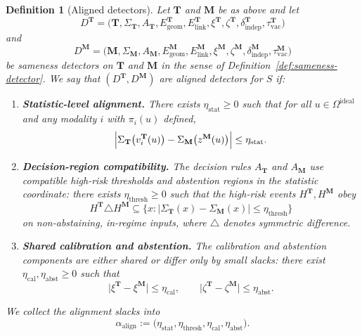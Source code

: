 \documentclass[11pt]{article}
\newtheorem{definition}{Definition}
\begin{document}
\begin{definition}[Aligned detectors]
\label{def:aligned-detectors}
Let $\mathbf{T}$ and $\mathbf{M}$ be as above and let
\[
D^{\mathbf{T}} =
\bigl(
  \mathbf{T},
  \Sigma_{\mathbf{T}}, A_{\mathbf{T}},
  E_{\mathrm{geom}}^{\mathbf{T}},
  E_{\mathrm{link}}^{\mathbf{T}},
  \xi^{\mathbf{T}}, \zeta^{\mathbf{T}},
  \delta_{\mathrm{indep}}^{\mathbf{T}},
  \tau_{\mathrm{vac}}^{\mathbf{T}}
\bigr)
\]
and
\[
D^{\mathbf{M}} =
\bigl(
  \mathbf{M},
  \Sigma_{\mathbf{M}}, A_{\mathbf{M}},
  E_{\mathrm{geom}}^{\mathbf{M}},
  E_{\mathrm{link}}^{\mathbf{M}},
  \xi^{\mathbf{M}}, \zeta^{\mathbf{M}},
  \delta_{\mathrm{indep}}^{\mathbf{M}},
  \tau_{\mathrm{vac}}^{\mathbf{M}}
\bigr)
\]
be sameness detectors on $\mathbf{T}$ and $\mathbf{M}$ in the sense of
Definition~\ref{def:sameness-detector}.  We say that $(D^{\mathbf{T}},
D^{\mathbf{M}})$ are \emph{aligned detectors} for $S$ if:

\begin{enumerate}[label=(\arabic*)]
\item \textbf{Statistic-level alignment.}  There exists
$\eta_{\mathrm{stat}} \ge 0$ such that for all $u \in
\Omega^{\mathrm{ideal}}$ and any modality $i$ with $\pi_i(u)$ defined,
\begin{equation}
\label{eq:stat-alignment}
\Bigl|
  \Sigma_{\mathbf{T}}\bigl(v_i^{\mathbf{T}}(u)\bigr)
  - \Sigma_{\mathbf{M}}\bigl(z^{\mathbf{M}}(u)\bigr)
\Bigr|
\le \eta_{\mathrm{stat}}.
\end{equation}
\item \textbf{Decision-region compatibility.}  The decision rules
$A_{\mathbf{T}}$ and $A_{\mathbf{M}}$ use compatible high-risk thresholds
and abstention regions in the statistic coordinate: there exists
$\eta_{\mathrm{thresh}} \ge 0$ such that the high-risk events
$H^{\mathbf{T}}, H^{\mathbf{M}}$ obey
\[
H^{\mathbf{T}} \triangle H^{\mathbf{M}}
  \subseteq
  \bigl\{ x :
    \bigl|\Sigma_{\mathbf{T}}(x) - \Sigma_{\mathbf{M}}(x)\bigr|
     \le \eta_{\mathrm{thresh}}
  \bigr\}
\]
on non-abstaining, in-regime inputs, where $\triangle$ denotes symmetric
difference.
\item \textbf{Shared calibration and abstention.}  The calibration and
abstention components are either shared or differ only by small slacks:
there exist $\eta_{\mathrm{cal}}, \eta_{\mathrm{abst}} \ge 0$ such that
\[
\bigl|\xi^{\mathbf{T}} - \xi^{\mathbf{M}}\bigr|
\le \eta_{\mathrm{cal}},
\qquad
\bigl|\zeta^{\mathbf{T}} - \zeta^{\mathbf{M}}\bigr|
\le \eta_{\mathrm{abst}}.
\]
\end{enumerate}
We collect the alignment slacks into
\[
\alpha_{\mathrm{align}}
  := \bigl(
      \eta_{\mathrm{stat}},
      \eta_{\mathrm{thresh}},
      \eta_{\mathrm{cal}},
      \eta_{\mathrm{abst}}
    \bigr).
\]
\end{definition}
\end{document}
